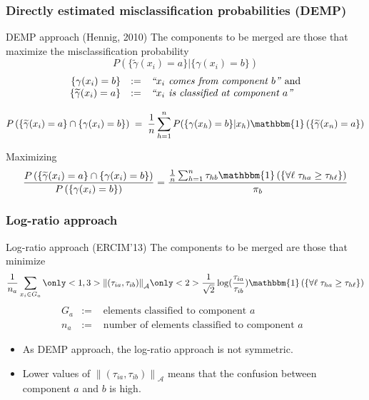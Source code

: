 \begin{frame}
\frametitle{Directly estimated misclassification probabilities (DEMP)}
\small
\begin{block}{DEMP approach (Hennig, 2010)}
The components to be merged are those that maximize the misclassification probability
\[
P\left( \{ \widetilde{\gamma}(x_i) = a \} | \{ \gamma(x_i) = b \} \right)
\]
\[
\begin{array}{rcl}
\{ \gamma(x_i) = b \} &:=& \text{\emph{``$x_i$ comes from component $b$''}} \text{ and} \\
\{\widetilde{\gamma}(x_i) = a\} &:=& \text{\emph{``$x_i$ is classified at component $a$''}}
\end{array}
\]
\end{block}

\[
P\left( \{ \widetilde{\gamma}(x_i) = a \} \cap \{ \gamma(x_i) = b\} \right) \;=\; 
\frac{1}{n}%
\sum_{h=1}^n P( \{ \gamma(x_h) = b \} | x_h) 
\mathbbm{1}\left( \{ \widetilde{\gamma}(x_n) = a \} \right)
\]

Maximizing%
\[
\frac{P\left( \{ \widetilde{\gamma}(x_i) = a \} \cap \{ \gamma(x_i) = b \} \right)}{ P\left( \{ \gamma(x_i) = b \} \right) } = 
\frac{%
  \frac{1}{n}%
  \sum_{h=1}^n \tau_{hb}
  \mathbbm{1}\left( \{ \forall \ell \; \tau_{ha} \geq \tau_{h\ell}  \} \right)
}{%
  \pi_b
}
\]
\end{frame}

\begin{frame}[t]
\frametitle{Log-ratio approach}
\small
\begin{block}{Log-ratio approach (ERCIM'13)}
The components to be merged are those that minimize
\[
\frac{1}{n_a} \sum_{x_i \in G_a}%
\only<1,3>{\left\| (\tau_{ia}, \tau_{ib}) \right\|_{\mathcal{A}}}%
\only<2>{\frac{1}{\sqrt{2}} \log (\frac{\tau_{ia}}{\tau_{ib}})}
\mathbbm{1}\left( \{ \forall \ell \; \tau_{ha} \geq \tau_{h\ell}  \}\right)
\]
\[\begin{array}{rcl}
G_a &:=& \text{ elements classified to component $a$ } \\
n_a &:=& \text{ number of elements classified to component $a$ }
\end{array}\]
\end{block}


\begin{itemize}
\item As DEMP approach, the log-ratio approach is not symmetric. 
\item Lower values of $\left\| (\tau_{ia}, \tau_{ib}) \right\|_{\mathcal{A}}$ means that the confusion between component $a$ and $b$ is high.
\end{itemize}

\end{frame}


